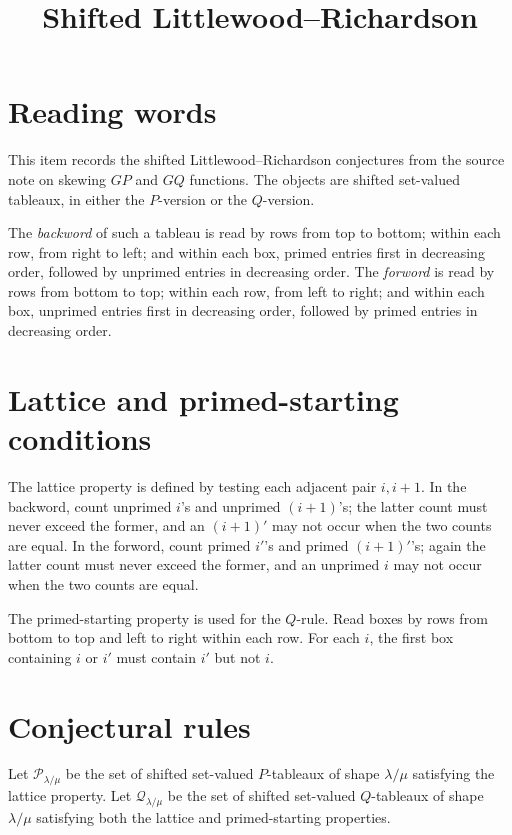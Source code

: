 \documentclass{article}
\title{Shifted Littlewood--Richardson}
\author{}
\date{}
\begin{document}
\maketitle

\section{Reading words}

This item records the shifted Littlewood--Richardson conjectures from the
source note on skewing \(GP\) and \(GQ\) functions.  The objects are shifted
set-valued tableaux, in either the \(P\)-version or the \(Q\)-version.

The \emph{backword} of such a tableau is read by rows from top to bottom; within
each row, from right to left; and within each box, primed entries first in
decreasing order, followed by unprimed entries in decreasing order.  The
\emph{forword} is read by rows from bottom to top; within each row, from left
to right; and within each box, unprimed entries first in decreasing order,
followed by primed entries in decreasing order.

\section{Lattice and primed-starting conditions}

The lattice property is defined by testing each adjacent pair \(i,i+1\).  In
the backword, count unprimed \(i\)'s and unprimed \((i+1)\)'s; the latter count
must never exceed the former, and an \((i+1)'\) may not occur when the two
counts are equal.  In the forword, count primed \(i'\)'s and primed
\((i+1)'\)'s; again the latter count must never exceed the former, and an
unprimed \(i\) may not occur when the two counts are equal.

The primed-starting property is used for the \(Q\)-rule.  Read boxes by rows
from bottom to top and left to right within each row.  For each \(i\), the first
box containing \(i\) or \(i'\) must contain \(i'\) but not \(i\).

\section{Conjectural rules}

Let \(\mathcal{P}_{\lambda/\mu}\) be the set of shifted set-valued
\(P\)-tableaux of shape \(\lambda/\mu\) satisfying the lattice property.  Let
\(\mathcal{Q}_{\lambda/\mu}\) be the set of shifted set-valued \(Q\)-tableaux of
shape \(\lambda/\mu\) satisfying both the lattice and primed-starting
properties.
\end{document}
